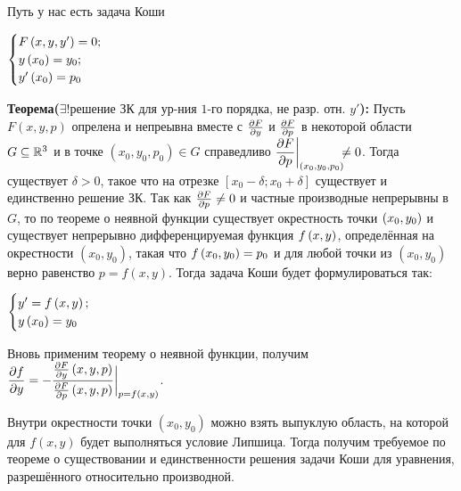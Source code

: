 Путь у нас есть задача Коши
\begin{center}
    $\begin{cases}
    F \left({x, y, y'}\right) = 0; \\
    y\left({x_0}\right) = y_0; \\
    y'\left({x_0}\right) = p_0
    \end{cases}$
\end{center}

\textbf{Теорема($\exists ! \text{решение ЗК для ур-ния 1-го порядка, не разр. отн. } y'$):}
\newline Пусть $F(x, y, p)$ опрелена и непреывна вместе с $ \frac{\partial F}{\partial y} $ и $ \frac{\partial F}{\partial p} $ в некоторой области $G\subseteq \mathbb{R}^3$ и в точке $(x_0, y_0, p_0) \in G $ справедливо $\mathlarger{\frac{\del F}{\del p} \bigg|_{\brackets{x_0, y_0, p_0}}}\!\!\! \neq 0$. \newline Тогда существует $\delta > 0$, такое что на отрезке $[x_0 - \delta; x_0 + \delta]$ существует и единственно решение ЗК. 
\bigbreak
\Proof Так как $\frac{\partial F}{\partial p} \neq 0$ и частные производные непрерывны в $G$, то по теореме о неявной функции существует окрестность точки $\left({x_0, y_0}\right)$ и существует непрерывно дифференцируемая функция $f\left({x,y}\right)$, определённая на окрестности $(x_0, y_0)$, такая что $f\left({x_0, y_0}\right) = p_0$ и для любой точки из $(x_0, y_0)$ верно равенство $p = f(x, y)$. Тогда задача Коши будет формулироваться так:

\begin{center}
    $\begin{cases}
    y' = f\left({x, y}\right); \\
    y\left({x_0}\right) = y_0
    \end{cases}$
\end{center}

Вновь применим теорему о неявной функции, получим $\mathlarger{\frac{\del f}{\del y} = - \frac{\frac{\del F}{\del y} \brackets{x, y, p}}{\frac{\del F}{\del p} \brackets{x, y, p}} \bigg|_{p = f \brackets{x, y}}}$.

Внутри окрестности точки $(x_0, y_0)$ можно взять выпуклую область, на которой для $f(x,y)$ будет выполняться условие Липшица. Тогда получим требуемое по теореме о существовании и единственности решения задачи Коши для уравнения, разрешённого относительно производной. \EndProof